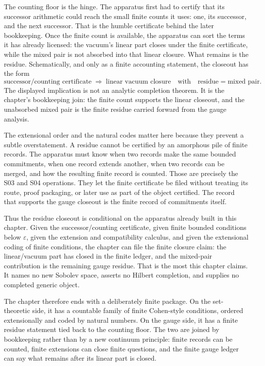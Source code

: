 The counting floor is the hinge. The apparatus first had to certify that its
successor arithmetic could reach the small finite counts it uses: one, its
successor, and the next successor. That is the humble certificate behind the
later bookkeeping. Once the finite count is available, the apparatus can sort
the terms it has already licensed: the vacuum's linear part closes under the
finite certificate, while the mixed pair is not absorbed into that linear
closure. What remains is the residue. Schematically, and only as a finite
accounting statement, the closeout has the form
\[
  \text{successor/counting certificate}
  \;\Longrightarrow\;
  \text{linear vacuum closure}
  \quad\text{with}\quad
  \text{residue} = \text{mixed pair}.
\]
The displayed implication is not an analytic completion theorem. It is the
chapter's bookkeeping join: the finite count supports the linear closeout, and
the unabsorbed mixed pair is the finite residue carried forward from the gauge
analysis.

The extensional order and the natural codes matter here because they prevent a
subtle overstatement. A residue cannot be certified by an amorphous pile of
finite records. The apparatus must know when two records make the same bounded
commitments, when one record extends another, when two records can be merged,
and how the resulting finite record is counted. Those are precisely the S03 and
S04 operations. They let the finite certificate be filed without treating its
route, proof packaging, or later use as part of the object certified. The record
that supports the gauge closeout is the finite record of commitments itself.

Thus the residue closeout is conditional on the apparatus already built in this
chapter. Given the successor/counting certificate, given finite bounded
conditions below \(\varepsilon\), given the extension and compatibility
calculus, and given the extensional coding of finite conditions, the chapter can
file the finite closure claim: the linear/vacuum part has closed in the finite
ledger, and the mixed-pair contribution is the remaining gauge residue. That is
the most this chapter claims. It names no new Sobolev space, asserts no Hilbert
completion, and supplies no completed generic object.

The chapter therefore ends with a deliberately finite package. On the
set-theoretic side, it has a countable family of finite Cohen-style conditions,
ordered extensionally and coded by natural numbers. On the gauge side, it has a
finite residue statement tied back to the counting floor. The two are joined by
bookkeeping rather than by a new continuum principle: finite records can be
counted, finite extensions can close finite questions, and the finite gauge
ledger can say what remains after its linear part is closed.

